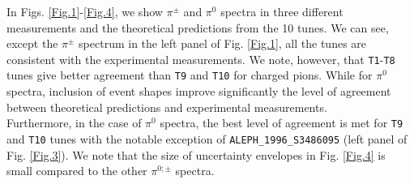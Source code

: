 \documentclass[aps,preprint,floatfix,nofootinbib,showpacs]{revtex4-1}
\begin{document}
In Figs. \ref{Fig.1}-\ref{Fig.4}, we show $\pi^\pm$ and $\pi^0$
spectra in three different measurements and the theoretical predictions 
from the 10 tunes. We can see, except the $\pi^\pm$ spectrum in the left panel of Fig. \ref{Fig.1},
all the tunes are consistent with the experimental measurements. We note, however, that 
\texttt{T1}-\texttt{T8} tunes give better agreement than \texttt{T9} and \texttt{T10}
for charged pions. While for $\pi^0$ spectra, inclusion of event shapes 
improve significantly the level of agreement between theoretical 
predictions and experimental measurements. \\
Furthermore, in the case of $\pi^0$ spectra, 
the best level of agreement is met for \texttt{T9} and \texttt{T10} tunes
with the notable exception of \texttt{ALEPH\_1996\_S3486095} (left panel of
Fig. \ref{Fig.3}). We note that the size of uncertainty envelopes
in Fig. \ref{Fig.4} is small compared to the other
$\pi^{0;\pm}$ spectra. \\ \\ \\ 
\end{document}
